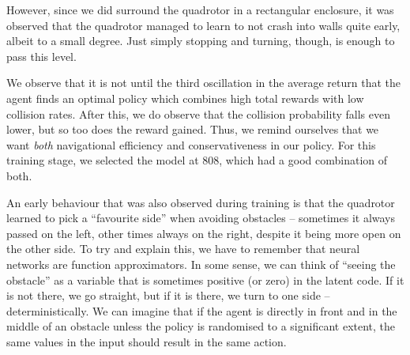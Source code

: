 However, since we did surround the quadrotor in a rectangular enclosure, it was observed that the quadrotor managed to learn to not crash into walls quite early, albeit to a small degree. Just simply stopping and turning, though, is enough to pass this level.

We observe that it is not until the third oscillation in the average return that the agent finds an optimal policy which combines high total rewards with low collision rates. After this, we do observe that the collision probability falls even lower, but so too does the reward gained. Thus, we remind ourselves that we want \textit{both} navigational efficiency and conservativeness in our policy. For this training stage, we selected the model at 808, which had a good combination of both.

An early behaviour that was also observed during training is that the quadrotor learned to pick a ``favourite side'' when avoiding obstacles -- sometimes it always passed on the left, other times always on the right, despite it being more open on the other side. To try and explain this, we have to remember that neural networks are function approximators. In some sense, we can think of ``seeing the obstacle'' as a variable that is sometimes positive (or zero) in the latent code. If it is not there, we go straight, but if it is there, we turn to one side -- deterministically. We can imagine that if the agent is directly in front and in the middle of an obstacle unless the policy is randomised to a significant extent, the same values in the input should result in the same action.

